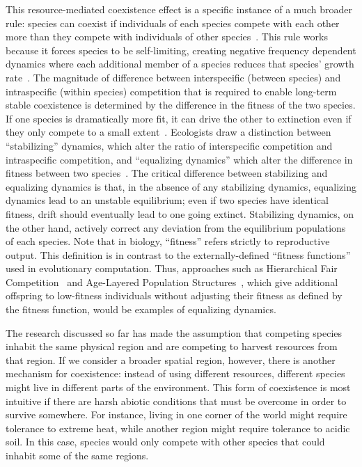 This resource-mediated coexistence effect is a specific instance of a much broader rule: species can coexist if individuals of each species compete with each other more than they compete with individuals of other species~\cite{chesson_mechanisms_2000}. This rule works because it forces species to be self-limiting, creating negative frequency dependent dynamics where each additional member of a species reduces that species' growth rate~\cite{adler_niche_2007}. The magnitude of difference between interspecific (between species) and intraspecific (within species) competition that is required to enable long-term stable coexistence is determined by the difference in the fitness of the two species. If one species is dramatically more fit, it can drive the other to extinction even if they only compete to a small extent~\cite{chesson_mechanisms_2000}. Ecologists draw a distinction between ``stabilizing'' dynamics, which alter the ratio of interspecific competition and intraspecific competition, and ``equalizing dynamics'' which alter the difference in fitness between two species~\cite{adler_niche_2007}. The critical difference between stabilizing and equalizing dynamics is that, in the absence of any stabilizing dynamics, equalizing dynamics lead to an unstable equilibrium; even if two species have identical fitness, drift should eventually lead to one going extinct. Stabilizing dynamics, on the other hand, actively correct any deviation from the equilibrium populations of each species. Note that in biology, ``fitness'' refers strictly to reproductive output. This definition is in contrast to the externally-defined ``fitness functions'' used in evolutionary computation. Thus, approaches such as Hierarchical Fair Competition~\cite{hu_hierarchical_2005} and Age-Layered Population Structures~\cite{hornby_alps:_2006}, which give additional offspring to low-fitness individuals without adjusting their fitness as defined by the fitness function, would be examples of equalizing dynamics.

The research discussed so far has made the assumption that competing species inhabit the same physical region and are competing to harvest resources from that region. If we consider a broader spatial region, however, there is another mechanism for coexistence: instead of using different resources, different species might live in different parts of the environment. This form of coexistence is most intuitive if there are harsh abiotic conditions that must be overcome in order to survive somewhere. For instance, living in one corner of the world might require tolerance to extreme heat, while another region might require tolerance to acidic soil. In this case, species would only compete with other species that could inhabit some of the same regions.


